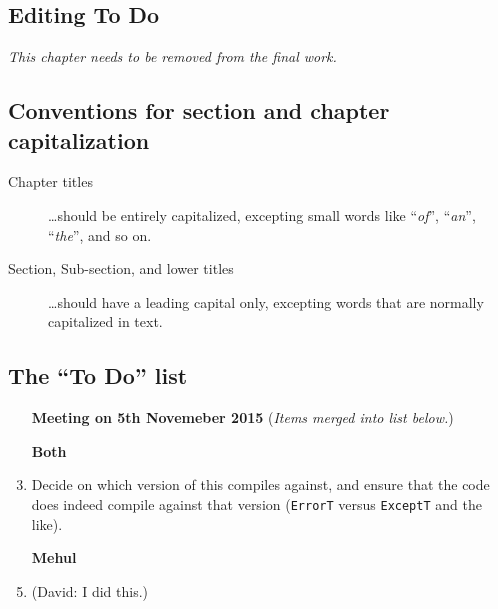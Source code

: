 
\begin{scope}
\nolinenumbers
\chapter{Editing To Do}\label{chap:to-do}

\textit{\color{red} This chapter needs to be removed from the final
  work.}

\section{Conventions for section and chapter capitalization}
\begin{description}
\item [Chapter titles]
  \dots should be entirely capitalized, excepting small words like
  ``\textit{of}'',
  ``\textit{an}'',
  ``\textit{the}'',
  and so on.
\item [Section, Sub-section, and lower titles]
  \dots should have a leading capital only, excepting words 
  that are normally capitalized in text.
\end{description}

\section{The ``To Do'' list}

\begin{enumerate}
\item [\textbf{Meeting on 5th Novemeber 2015}]
  (\textit{Items merged into list below.})

\item [\textbf{Both}]

\item
  Decide on which version of  this compiles against, and ensure that the code does indeed compile 
  against that version (\Verb!ErrorT! versus \Verb!ExceptT! and the like).

\item [\textbf{Mehul}]

\item (David: I did this.)


\end{enumerate}
\end{scope}
